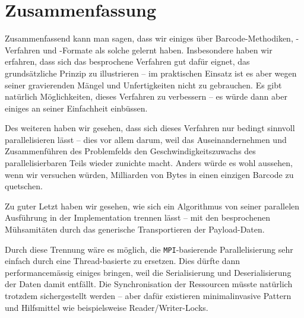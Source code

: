 \documentclass[11pt]{scrreprt} %
\theoremstyle{definition}
\begin{document}
\chapter{Zusammenfassung}

Zusammenfassend kann man sagen, dass wir einiges über Barcode-Methodiken, -Verfahren und -Formate als solche gelernt haben. Insbesondere haben wir erfahren, dass sich das besprochene Verfahren gut dafür eignet, das grundsätzliche Prinzip zu illustrieren -- im praktischen Einsatz ist es aber wegen seiner gravierenden Mängel und Unfertigkeiten nicht zu gebrauchen. Es gibt natürlich Möglichkeiten, dieses Verfahren zu verbessern -- es würde dann aber einiges an seiner Einfachheit einbüssen.

Des weiteren haben wir gesehen, dass sich dieses Verfahren nur bedingt sinnvoll parallelisieren lässt -- dies vor allem darum, weil das Auseinandernehmen und Zusammenführen des Problemfelds den Geschwindigkeitszuwachs des parallelisierbaren Teils wieder zunichte macht. Anders würde es wohl aussehen, wenn wir versuchen würden, Milliarden von Bytes in einen einzigen Barcode zu quetschen.

Zu guter Letzt haben wir gesehen, wie sich ein Algorithmus von seiner parallelen Ausführung in der Implementation trennen lässt -- mit den besprochenen Mühsamitäten durch das generische Transportieren der Payload-Daten.

Durch diese Trennung wäre es möglich, die {\tt MPI}-basierende Parallelisierung sehr einfach durch eine Thread-basierte zu ersetzen. Dies dürfte dann performancemässig einiges bringen, weil die Serialisierung und Deserialisierung der Daten damit entfällt. Die Synchronisation der Ressourcen müsste natürlich trotzdem sichergestellt werden -- aber dafür existieren minimalinvasive Pattern und Hilfsmittel wie beispielsweise Reader/Writer-Locks.




\listoffigures
\listoftables
\end{document}
